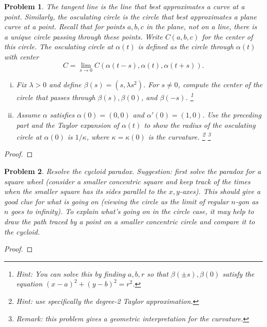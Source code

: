 \documentclass[11pt]{article}
\newtheorem{problem}{Problem}
\begin{document}
\begin{problem}
The tangent line is the line that best approximates a curve at a point. Similarly, the osculating circle is the circle that best approximates a plane curve at a point. Recall that for points $a,b,c$ in the plane, not on a line, there is a unique circle passing through these points. Write $C(a,b,c)$ for the center of this circle. The osculating circle at $\alpha(t)$ is defined as the circle through $\alpha(t)$ with center 
\[C=\lim_{s\to0} C(\alpha(t-s),\alpha(t),\alpha(t+s)).\]
\begin{enumerate}[(i)]
\item Fix $\lambda>0$ and define $\beta(s)=(s,\lambda s^2)$. For $s\neq0$, compute the center of the circle that passes through $\beta(s),\beta(0)$, and $\beta(-s)$.  \footnote{Hint: You can solve this by finding $a,b,r$ so that $\beta(\pm s),\beta(0)$ satisfy the equation $(x-a)^2+(y-b)^2=r^2$.}
\item Assume $\alpha$ satisfies $\alpha(0)=(0,0)$ and $\alpha'(0)=(1,0)$. Use the preceding part and the Taylor expansion of $\alpha(t)$ to show the radius of the osculating circle at $\alpha(0)$ is $1/\kappa$, where $\kappa=\kappa(0)$ is the curvature. \footnote{Hint: use specifically the degree-2 Taylor approximation.} \footnote{Remark: this problem gives a geometric interpretation for the curvature. }
\end{enumerate} 
\end{problem}

\begin{proof}

\end{proof}

\pagebreak



\begin{problem}
Resolve the cycloid paradox. Suggestion: first solve the paradox for a square wheel (consider a smaller concentric square and keep track of the times when the smaller square has its sides parallel to the $x,y$-axes). This should give a good clue for what is going on (viewing the circle as the limit of regular $n$-gon as $n$ goes to infinity). To explain what's going on in the circle case, it may help to draw the path traced by a point on a smaller concentric circle and compare it to the cycloid. 
\end{problem}

\begin{proof}

\end{proof}
\end{document}
